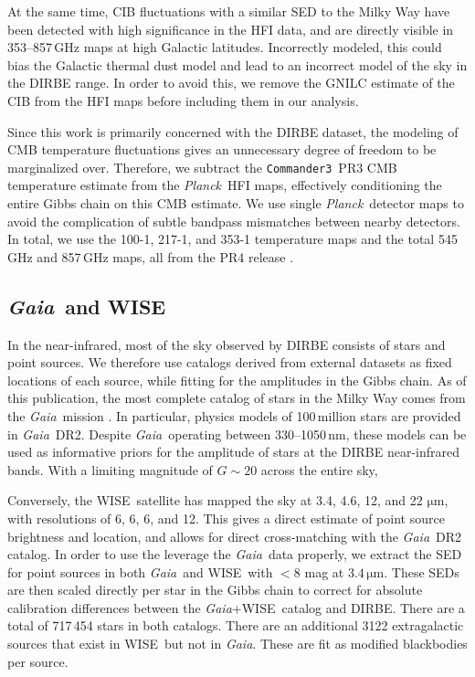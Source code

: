 \documentclass{aa}
\def\commanderthree{\texttt{Commander3}}
\def\Planck{\textit{Planck}}
\def\GAIA{\textit{Gaia}}
\def\gaia{\textit{Gaia}}
\def\Gaia{\textit{Gaia}}
\def\WISE{WISE}
\begin{document}
At the same time, CIB fluctuations with a similar SED to the Milky Way have been detected with high significance in the HFI data, and are directly visible in 353--857\,GHz maps at high Galactic latitudes. Incorrectly modeled, this could bias the Galactic thermal dust model and lead to an incorrect model of the sky in the DIRBE range. In order to avoid this, we remove the GNILC estimate of the CIB from the HFI maps before including them in our analysis.

Since this work is primarily concerned with the DIRBE dataset, the modeling of CMB temperature fluctuations gives an unnecessary degree of freedom to be marginalized over. Therefore, we subtract the \commanderthree\ PR3 CMB temperature estimate from the \Planck\ HFI maps, effectively conditioning the entire Gibbs chain on this CMB estimate.
We use single \Planck\ detector maps to avoid the complication of subtle bandpass mismatches between nearby detectors. In total, we use the 100-1, 217-1, and 353-1 temperature maps and the total 545\,GHz and 857\,GHz maps, all from the PR4 release \citep{npipe}.

\subsection{\GAIA\ and \WISE}

In the near-infrared, most of the sky observed by DIRBE consists of stars and point sources. We therefore use catalogs derived from external datasets as fixed locations of each source, while fitting for the amplitudes in the Gibbs chain. As of this publication, the most complete catalog of stars in the  Milky Way comes from the \Gaia\ mission \cite{gaia:2016,gaia:2018}. In particular, physics models of 100\,million stars are provided in \Gaia\ DR2. Despite \Gaia\ operating between 330--1050\,nm, these models can be used as informative priors for the amplitude of stars at the DIRBE near-infrared bands. With a limiting magnitude of $G\sim20$ across the entire sky,

Conversely, the \WISE\ satellite \citep{wright:2010} has mapped the sky at 3.4, 4.6, 12, and 22 $\mathrm{\mu m}$, with resolutions of 6, 6, 6, and 12. This gives a direct estimate of point source brightness and location, and allows for direct cross-matching with the \GAIA\ DR2 catalog. In order to use the leverage the \gaia\ data properly, we extract the SED for point sources in both \gaia\ and \WISE\ with $<8$ mag at $3.4\,\mathrm{\mu m}$. These SEDs are then scaled directly per star in the Gibbs chain to correct for absolute calibration differences between the \gaia+\WISE\ catalog and DIRBE. There are a total of 717\,454 stars in both catalogs. There are an additional 3122 extragalactic sources that exist in \WISE\ but not in \gaia. These are fit as modified blackbodies per source.
\end{document}

